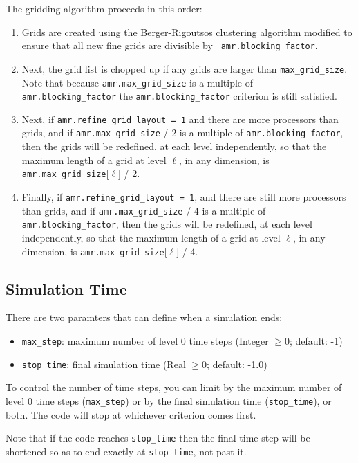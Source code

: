 The gridding algorithm proceeds in this order:
\begin{enumerate}
\item Grids are created using the Berger-Rigoutsos clustering algorithm 
modified to ensure that all new fine grids are divisible by {\tt
amr.blocking\_factor}.

\item Next, the grid list is chopped up if any grids are larger than {\tt max\_grid\_size}.
Note that because {\tt amr.max\_grid\_size} is a multiple of {\tt
amr.blocking\_factor} the {\tt amr.blocking\_factor} criterion is
still satisfied.

\item Next, if {\tt amr.refine\_grid\_layout = 1} and there are more processors than grids, and
if {\tt amr.max\_grid\_size} / 2 is a multiple of {\tt amr.blocking\_factor},
then the grids will be redefined, at each level independently, so that
the maximum length of a grid at level $\ell$, in any dimension, is
{\tt amr.max\_grid\_size}[$\ell$] / 2.

\item Finally, if {\tt amr.refine\_grid\_layout = 1},  and there are still more processors
than grids, and if {\tt amr.max\_grid\_size} / 4 is a multiple of {\tt
amr.blocking\_factor}, then the grids will be redefined, at each level
independently, so that the maximum length of a grid at level $\ell$,
in any dimension, is {\tt amr.max\_grid\_size}[$\ell$] / 4.
\end{enumerate}


\subsection{Simulation Time}

There are two paramters that can define when a simulation ends:
\begin{itemize}
\item {\tt max\_step}: maximum number of level 0 time steps (Integer $\geq 0$; default: -1)
\item {\tt stop\_time}: final simulation time (Real $\geq 0$;  default: -1.0)
\end{itemize}
To control the number of time steps, you can limit by the maximum
number of level 0 time steps ({\tt max\_step}) or by the final
simulation time ({\tt stop\_time}), or both. The code will stop at
whichever criterion comes first.

Note that if the code reaches {\tt stop\_time} then the final time
step will be shortened so as to end exactly at {\tt stop\_time}, not
past it.

